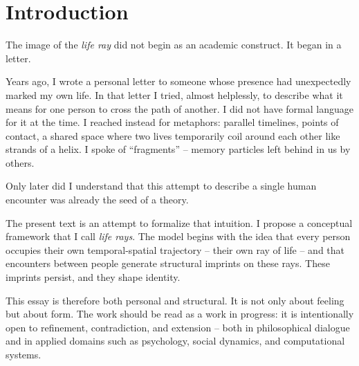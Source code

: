 \section{Introduction}

The image of the \textit{life ray} did not begin as an academic construct. It began in a letter.

Years ago, I wrote a personal letter to someone whose presence had unexpectedly marked my own life.
In that letter I tried, almost helplessly, to describe what it means for one person to cross the path of another.
I did not have formal language for it at the time. I reached instead for metaphors: parallel timelines, points of contact,
a shared space where two lives temporarily coil around each other like strands of a helix.
I spoke of ``fragments'' -- memory particles left behind in us by others.

Only later did I understand that this attempt to describe a single human encounter was already the seed of a theory.

The present text is an attempt to formalize that intuition. I propose a conceptual framework that I call \textit{life rays}.
The model begins with the idea that every person occupies their own temporal-spatial trajectory -- their own ray of life
-- and that encounters between people generate structural imprints on these rays.
These imprints persist, and they shape identity.

This essay is therefore both personal and structural. It is not only about feeling but about form.
The work should be read as a work in progress: it is intentionally open to refinement, contradiction,
and extension -- both in philosophical dialogue and in applied domains such as psychology, social dynamics, and computational systems.

